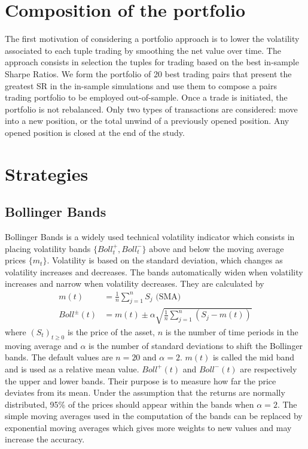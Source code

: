 \documentclass[11pt,a4,twosided,singlespacing,titlepagenumber=on]{scrreprt}
\numberwithin{equation}{chapter} %
\theoremstyle{remark}
\begin{document}
\section{Composition of the portfolio}
The first motivation of considering a portfolio approach is to lower the volatility associated to each tuple trading by smoothing the net value over time. The approach consists in selection the tuples for trading based on the best in-sample Sharpe Ratios. We form the portfolio of 20 best trading pairs that present the greatest SR in the in-sample simulations and use them to compose a pairs trading portfolio to be employed out-of-sample. Once a trade is initiated, the portfolio is not rebalanced. Only two types of transactions are considered: move into a new position, or the total unwind of a previously opened position. Any opened position is closed at the end of the study.

\section{Strategies}
\subsection{Bollinger Bands}
Bollinger Bands is a widely used technical volatility indicator which consists in placing volatility bands $\{Boll^+_t, Boll^-_t\}$ above and below the moving average prices $\{m_t\}$. Volatility is based on the standard deviation, which changes as volatility increases and decreases. The bands automatically widen when volatility increases and narrow when volatility decreases. They are calculated by
\begin{align*}
m(t) &= \frac{1}{n}\sum_{j=1}^n S_j \text{ (SMA)} \\
Boll^\pm(t) &= m(t) \pm \alpha \sqrt{\frac{1}{n} \sum_{j=1}^n \left(S_j - m(t) \right)}
\end{align*}
where $(S_t)_{t \geq 0}$ is the price of the asset, $n$ is the number of time periods in the moving average and $\alpha$ is the number of standard deviations to shift the Bollinger bands. The default values are $n = 20$ and $\alpha = 2$. $m(t)$ is called the mid band and is used as a relative mean value. $Boll^+(t)$ and $Boll^-(t)$ are respectively the upper and lower bands. Their purpose is to measure how far the price deviates from its mean. Under the assumption that the returns are normally distributed, 95\% of the prices should appear within the bands when $\alpha = 2$. The simple moving averages used in the computation of the bands can be replaced by exponential moving averages which gives more weights to new values and may increase the accuracy.
\end{document}
